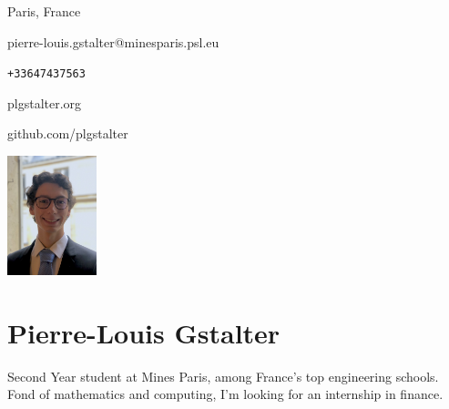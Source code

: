 \documentclass{article}
\begin{document}
\begin{multicols}{3}

Paris, France

pierre-louis.gstalter@minesparis.psl.eu

\texttt{+33647437563}

plgstalter.org

github.com/plgstalter

\columnbreak

	\hfill\includegraphics[width=2.6cm]{photo.jpeg}

\columnbreak

{\color{blue} \section*{Pierre-Louis Gstalter}}

\noindent Second Year student at Mines Paris, among France's top engineering schools. Fond of mathematics and computing, I'm looking for an internship in finance.
\end{multicols}
\end{document}
